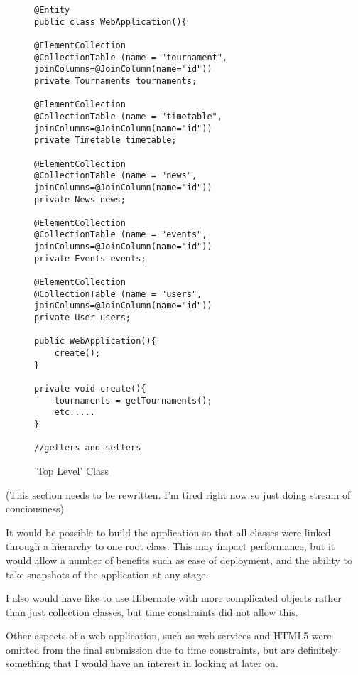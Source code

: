 \begin{figure}[H]
\begin{lstlisting}
@Entity
public class WebApplication(){

@ElementCollection
@CollectionTable (name = "tournament", joinColumns=@JoinColumn(name="id"))
private Tournaments tournaments;

@ElementCollection
@CollectionTable (name = "timetable", joinColumns=@JoinColumn(name="id"))
private Timetable timetable;

@ElementCollection
@CollectionTable (name = "news", joinColumns=@JoinColumn(name="id"))
private News news;

@ElementCollection
@CollectionTable (name = "events", joinColumns=@JoinColumn(name="id"))
private Events events;

@ElementCollection
@CollectionTable (name = "users", joinColumns=@JoinColumn(name="id"))
private User users;

public WebApplication(){
	create();
}

private void create(){
	tournaments = getTournaments();
	etc.....
}

//getters and setters

\end{lstlisting}
\caption{'Top Level' Class}
\label{fig:toplevel}
\end{figure}

(This section needs to be rewritten. I'm tired right now so just doing stream of conciousness) 

It would be possible to build the application so that all classes were linked through a hierarchy to one root class. This may impact performance, but it would allow a number of benefits such as ease of deployment, and the ability to take snapshots of the application at any stage.

I also would have like to use Hibernate with more complicated objects rather than just collection classes, but time constraints did not allow this.

Other aspects of a web application, such as web services and HTML5 were omitted from the final submission due to time constraints, but are definitely something that I would have an interest in looking at later on.